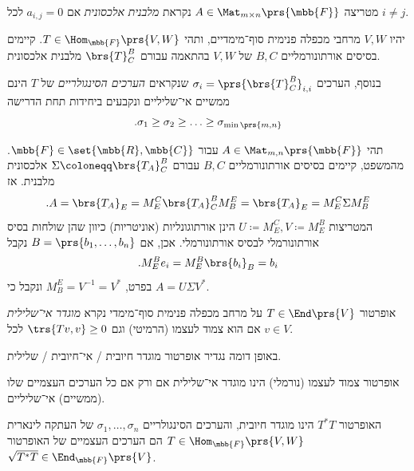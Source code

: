\documentclass[a4paper,10pt,twoside,openany]{book}
\begin{document}
\begin{definition}
מטריצה
$A \in \Mat_{m \times n}\prs{\mbb{F}}$
נקראת
\emph{מלבנית אלכסונית}
אם
$a_{i,j} = 0$
לכל
$i \neq j$.
\end{definition}

\begin{theorem}
יהיו
$V,W$
מרחבי מכפלה פנימית סוף־מימדיים, ותהי
$T \in \Hom_{\mbb{F}}\prs{V,W}$.
קיימים בסיסים אורתונורמליים
$B,C$
של
$V,W$
בהתאמה עבורם
$\brs{T}^B_C$
מלבנית אלכסונית.

בנוסף, הערכים
$\sigma_i = \prs{\brs{T}^B_C}_{i,i}$
שנקראים
\emph{הערכים הסינגולריים}
של
$T$
הינם ממשיים אי־שליליים ונקבעים ביחידות תחת הדרישה
\[\text{.} \sigma_1 \geq \sigma_2 \geq \ldots \geq \sigma_{\min\prs{m,n}}\]
\end{theorem}

\begin{corollary} \label{corollary:matrix-svd}
תהי
$A \in \Mat_{m,n}\prs{\mbb{F}}$
עבור
$\mbb{F} \in \set{\mbb{R}, \mbb{C}}$.
מהמשפט, קיימים בסיסים אורתונורמליים
$B,C$
עבורם
$\Sigma \coloneqq \brs{T_A}^B_C$
אלכסונית מלבנית.
אז
\[\text{.} A = \brs{T_A}_E = M^C_E \brs{T_A}^B_C M^E_B = \brs{T_A}_E = M^C_E \Sigma M^E_B\]
המטריצות
$U \coloneqq M^C_E, V \coloneqq M^B_E$
הינן אורתוגונליות (אוניטריות) כיוון שהן שולחות בסיס אורתונורמלי לבסיס אורתונורמלי. אכן, אם
$B = \prs{b_1, \ldots, b_n}$
נקבל
\[\text{.} M^B_E e_i = M^B_E \brs{b_i}_B = b_i\]
בפרט,
$M^E_B = V^{-1} = V^*$
ונקבל כי
$A = U \Sigma V^*$.
\end{corollary}

\begin{definition}
אופרטור
$T \in \End\prs{V}$
על מרחב מכפלה פנימית סוף־מימדי נקרא
\emph{מוגדר אי־שלילית}
אם הוא צמוד לעצמו (הרמיטי) וגם
$\trs{Tv, v} \geq 0$
לכל
$v \in V$.
\end{definition}

\begin{remark}
באופן דומה נגדיר אופרטור מוגדר חיובית%
\slash%
אי־חיובית%
\slash
שלילית.
\end{remark}

\begin{proposition}
אופרטור צמוד לעצמו (נורמלי) הינו מוגדר אי־שלילית אם ורק אם כל הערכים העצמיים שלו (ממשיים) אי־שליליים.
\end{proposition}

\begin{proposition}
האופרטור
$T^* T$
הינו מוגדר חיובית, והערכים הסינגולריים
$\sigma_1, \ldots, \sigma_n$
של העתקה לינארית
$T \in \Hom_{\mbb{F}}\prs{V,W}$
הם הערכים העצמיים של האופרטור
$\sqrt{T^* T} \in \End_{\mbb{F}}\prs{V}$.
\end{proposition}
\end{document}
